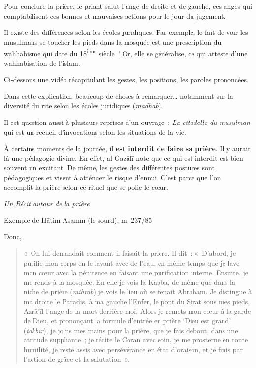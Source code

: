 Pour conclure la prière, le priant salut l'ange de droite et de gauche,
ces anges qui comptabilisent ces bonnes et mauvaises actions pour le
jour du jugement.

Il existe des différences selon les écoles juridiques. Par exemple, le
fait de voir les musulmans se toucher les pieds dans la mosquée est une
prescription du wahhabisme qui date du 18\textsuperscript{ème} siècle~!
Or, elle se généralise, ce qui atteste d'une wahhabisation de l'islam.

Ci-dessous une vidéo récapitulant les gestes, les positions, les paroles
prononcées.

Dans cette explication, beaucoup de choses à remarquer\ldots{} notamment
sur la diversité du rite selon les écoles juridiques (\emph{maḏhab}).

Il est question aussi à plusieurs reprises d'un ouvrage~: \emph{La
citadelle du musulman} qui est un recueil d'invocations selon les
situations de la vie.

À certains moments de la journée, il \textbf{est interdit de faire sa
prière}. Il y aurait là une pédagogie divine. En effet, al-Ġazālī \label{theol:AlGazali14} note
que ce qui est interdit est bien souvent un excitant. De même, les
gestes des différentes postures sont pédagogiques et visent à atténuer
le risque d'ennui. C'est parce que l'on accomplit la prière selon ce
rituel que se polie le cœur.

\emph{Un Récit autour de la prière}

Exemple de Hātim Asamm (le sourd), m. 237/85 

Donc, 
\begin{quote}
    

«~On lui demandait comment il faisait la prière. Il dit~:
«~D'abord, je purifie mon corps en le lavant avec de l'eau, en même
temps que je lave mon cœur avec la pénitence en faisant une purification
interne. Ensuite, je me rends à la mosquée. En elle je vois la Kaaba, de
même que dans la niche de prière (\emph{mihrāb}) je vois le lieu où se
tenait Abraham. Je distingue à ma droite le Paradis, à ma gauche
l'Enfer, le pont du Sirāt sous mes pieds, Azrā'īl l'ange de la mort
derrière moi. Alors je remets mon cœur à la garde de Dieu, et prononçant
la formule d'entrée en prière `Dieu est grand' (\emph{takbīr}), je joins
mes mains pour la prière, que je fais debout, dans une attitude
suppliante~; je récite le Coran avec soin, je me prosterne en toute
humilité, je reste assis avec persévérance en état d'oraison, et je
finis par l'action de grâce et la salutation~».
\end{quote}

